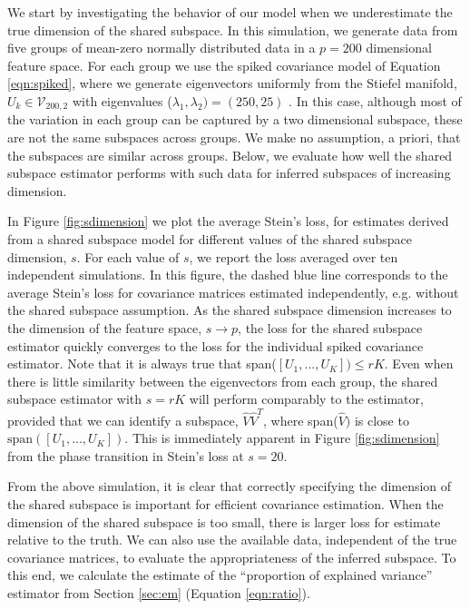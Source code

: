 \documentclass[12pt]{article}
\begin{document}
We start by investigating the behavior of our model when we
underestimate the true dimension of the shared subspace.  In this
simulation, we generate data from five groups of mean-zero normally
distributed data in a $p=200$ dimensional feature space.  For each
group we use the spiked covariance model of Equation \ref{eqn:spiked},
where we generate eigenvectors uniformly from the Stiefel manifold,
$U_k \in \mathcal{V}_{200, 2}$ with eigenvalues
($\lambda_1, \lambda_2) = (250, 25)$ .  In this case, although most of
the variation in each group can be captured by a two dimensional
subspace, these are not the same subspaces across groups.  We make no
assumption, a priori, that the subspaces are similar across groups.
Below, we evaluate how well the shared subspace estimator performs with such
data for inferred subspaces of increasing dimension.

In Figure \ref{fig:sdimension} we plot the average Stein's loss, for
estimates derived from a shared subspace model for different values
of the shared subspace dimension, $s$.  For each value of $s$, we
report the loss averaged over ten independent simulations.  In this
figure, the dashed blue line corresponds to the average Stein's loss
for covariance matrices estimated independently, e.g. without the
shared subspace assumption.  As the shared subspace dimension increases to the
dimension of the feature space, $s \rightarrow p$, the loss for the
shared subspace estimator quickly converges to the loss for the
individual spiked covariance estimator.  Note that
it is always true that span($[U_1, ..., U_K]) \leq rK$.  Even when there is little
similarity between the eigenvectors from each group, the shared
subspace estimator with $s = rK$ will perform comparably to the
estimator, provided that we can identify a subspace, $\hat{V}\hat{V}^T$, where
span($\hat{V})$ is close to $\text{span}([U_1, ..., U_K])$.  This is
immediately apparent in Figure \ref{fig:sdimension} from the phase transition
in Stein's loss at $s = 20$.

From the above simulation, it is clear that correctly specifying the
dimension of the shared subspace is important for efficient covariance
estimation.  When the dimension of the shared subspace is too small,
there is larger loss for estimate relative to the truth.  We can also
use the available data, independent of the true covariance matrices,
to evaluate the appropriateness of the inferred subspace.  To this
end, we calculate the estimate of the ``proportion of explained
variance'' estimator from Section \ref{sec:em} (Equation
\ref{eqn:ratio}).
\end{document}
